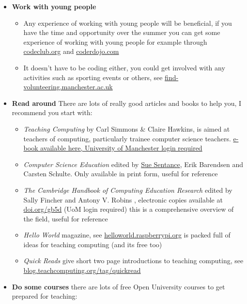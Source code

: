 \documentclass[
  12pt,
]{book}
\providecommand{\tightlist}{%
  \setlength{\itemsep}{0pt}\setlength{\parskip}{0pt}}
\begin{document}
\begin{itemize}
\tightlist
\item
  \textbf{Work with young people}

  \begin{itemize}
  \tightlist
  \item
    Any experience of working with young people will be beneficial, if you have the time and opportunity over the summer you can get some experience of working with young people for example through \href{https://codeclub.org/}{codeclub.org} and \href{https://coderdojo.com/}{coderdojo.com}
  \item
    It doesn't have to be coding either, you could get involved with any activities such as sporting events or others, see \href{https://find-volunteering.manchester.ac.uk/}{find-volunteering.manchester.ac.uk}
  \end{itemize}
\item
  \textbf{Read around} There are lots of really good articles and books to help you, I recommend you start with:

  \begin{itemize}
  \tightlist
  \item
    \emph{Teaching Computing} \citep{teachingcomputing} by Carl Simmons \& Claire Hawkins, is aimed at teachers of computing, particularly trainee computer science teachers. \href{http://dx.doi.org.manchester.idm.oclc.org/10.4135/9781473919785}{e-book available here, University of Manchester login required}
  \item
    \emph{Computer Science Education} \citep{cse} edited by \href{https://en.wikipedia.org/wiki/Sue_Sentance}{Sue Sentance}, Erik Barendsen and Carsten Schulte. Only available in print form, useful for reference
  \item
    \emph{The Cambridge Handbook of Computing Education Research} edited by Sally Fincher and Antony V. Robins \citep{CERhandbook}, electronic copies available at \href{https://doi.org/gb5d}{doi.org/gb5d} (UoM login required) this is a comprehensive overview of the field, useful for reference
  \item
    \emph{Hello World} magazine, see \href{https://helloworld.raspberrypi.org/}{helloworld.raspberrypi.org} is packed full of ideas for teaching computing (and its free too)
  \item
    \emph{Quick Reads} give short two page introductions to teaching computing, see \href{https://blog.teachcomputing.org/tag/quickread/}{blog.teachcomputing.org/tag/quickread}
  \end{itemize}
\item
  \textbf{Do some courses} there are lots of free Open University courses to get prepared for teaching:


\end{itemize}
\end{document}
